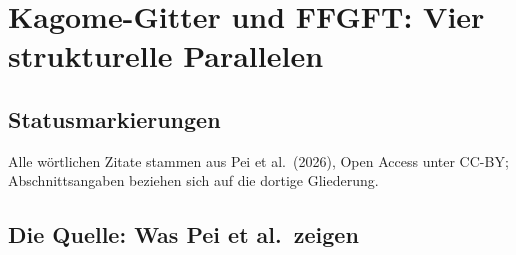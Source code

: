 
\providecommand{\BM}{\textbf{[B]}}
\providecommand{\KM}{\textbf{[K]}}
\providecommand{\SM}{\textbf{[S]}}
\providecommand{\SetzM}{\textbf{[SETZUNG]}}
\providecommand{\QM}{\textbf{[Q]}}

\chapter*{Kagome-Gitter und FFGFT: Vier strukturelle Parallelen}

\begin{abstract}
Pei, Chen, Castelnovo und Moessner (PRL~137, 106702, 31.~August 2026, Open
Access) untersuchen das einfach dotierte Hubbard-Modell mit unendlicher
Abstoßung auf dem Kagome-Gitter. Sie finden resonante Valenzbindungs-Polaronen
(RVB-Polaronen), störungsfreie Selbstlokalisierung mit Bandmassenanstieg um
sechs Größenordnungen sowie einen Übergang zu $\sqrt{3}\times\sqrt{3}$-Ordnung
im unpolarisierten Grenzfall, den sie am Drei-Zustands-Potts-Modell messen.
Dieses Dokument identifiziert vier strukturelle Parallelen zur FFGFT und belegt
jede mit dem Wortlaut der Quelle. Die Parallelen führen auf dieselbe algebraische
Wurzel: den Frobenius-Automorphismus $\phi: x \mapsto x^3$ der Ordnung~3 auf
endlichen Körpern. Ein Abschnitt benennt, was \emph{nicht} übereinstimmt.
Status aller vier Parallelen: \SM\ (strukturelle Übereinstimmung nachgewiesen,
physikalische Identifikation offen).
\end{abstract}

\section*{Statusmarkierungen}


\noindent Alle wörtlichen Zitate stammen aus Pei et al.\ (2026), Open Access
unter CC-BY; Abschnittsangaben beziehen sich auf die dortige Gliederung.

\section{Die Quelle: Was Pei et al.\ zeigen}

